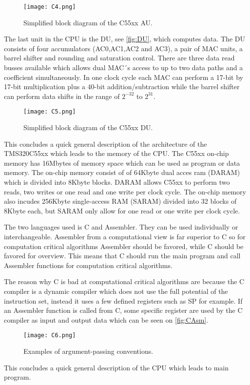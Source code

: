 \begin{figure}[H]
\centering
\texttt{[image: C4.png]}
\caption{Simplified block diagram of the C55xx AU.}
\label{fig:AU}
\end{figure}
The last unit in the CPU is the DU, see \autoref{fig:DU}, which computes data. The DU consists of four accumulators (AC0,AC1,AC2 and AC3), a pair of MAC units, a barrel shifter and rounding and saturation control. There are three data read busses available which allows dual MAC´s access to up to two data paths and a coefficient simultaneously. In one clock cycle each MAC can perform a 17-bit by 17-bit multiplication plus a 40-bit addition/subtraction while the barrel shifter can perform data shifts in the range of $2^{-32}$ to $2^{31}$. 
\begin{figure}[H]
\centering
\texttt{[image: C5.png]}
\caption{Simplified block diagram of the C55xx DU.}
\label{fig:DU}
\end{figure}
This concludes a quick general description of the architecture of the TMS320C55xx which leads to the memory of the CPU. The C55xx on-chip memory has 16Mbytes of memory space which can be used as program or data memory. The on-chip memory consist of of 64Kbyte dual acces ram (DARAM) which is divided into 8Kbyte blocks. DARAM allows C55xx to perform two reads, two writes or one read and one write per clock cycle. The on-chip memory also incudes 256Kbyte single-access RAM (SARAM) divided into 32 blocks of 8Kbyte each, but SARAM only allow for one read or one write per clock cycle.

The two languages used is C and Assembler. They can be used individually or interchangeable. Assembler from a computational view is far superior to C so for computation critical algorithms Assembler should be favored, while C should be favored for overview. This means that C should run the main program and call Assembler functions for computation critical algorithms. 

The reason why C is bad at computational critical algorithms are because the C compiler is a dynamic compiler which does not use the full potential of the instruction set, instead it uses a few defined registers such as SP for example. If an Assembler function is called from C, some specific register are used by the C compiler as input and output data which can be seen on \autoref{fig:CAsm}.
\begin{figure}[H]
\centering
\texttt{[image: C6.png]}
\caption{Examples of argument-passing conventions.}
\label{fig:CAsm}
\end{figure}
This concludes a quick general description of the CPU which leads to main program.
